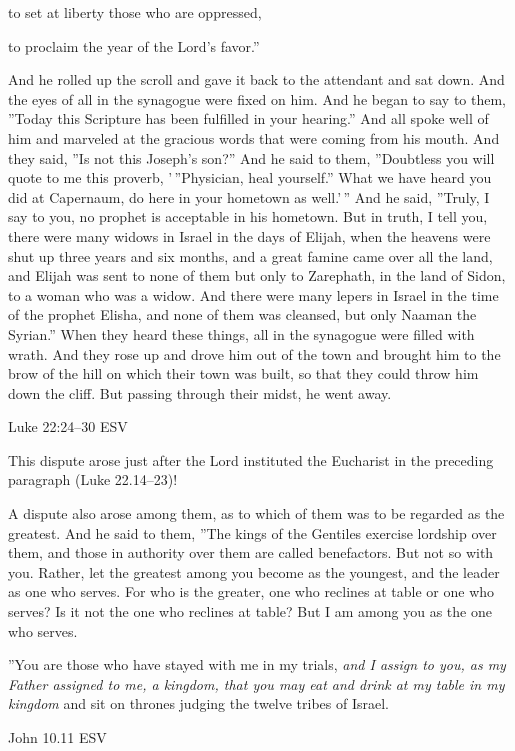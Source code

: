 \documentclass[
]{article}
\newcommand{\RL}[1]{\beginR #1\endR}
\begin{document}
to set at liberty those who are oppressed,

to proclaim the year of the Lord\RL{'}s favor.''

And he rolled up the scroll and gave it back to the attendant and sat
down. And the eyes of all in the synagogue were fixed on him. And he
began to say to them, \RL{''}Today this Scripture has been fulfilled in
your hearing.'' And all spoke well of him and marveled at the gracious
words that were coming from his mouth. And they said, \RL{''}Is not this
Joseph\RL{'}s son?'' And he said to them, \RL{''}Doubtless you will
quote to me this proverb, \RL{'\,''}Physician, heal yourself.'' What we
have heard you did at Capernaum, do here in your hometown as well.'\,''
And he said, \RL{''}Truly, I say to you, no prophet is acceptable in his
hometown. But in truth, I tell you, there were many widows in Israel in
the days of Elijah, when the heavens were shut up three years and six
months, and a great famine came over all the land, and Elijah was sent
to none of them but only to Zarephath, in the land of Sidon, to a woman
who was a widow. And there were many lepers in Israel in the time of the
prophet Elisha, and none of them was cleansed, but only Naaman the
Syrian.'' When they heard these things, all in the synagogue were filled
with wrath. And they rose up and drove him out of the town and brought
him to the brow of the hill on which their town was built, so that they
could throw him down the cliff. But passing through their midst, he went
away.

Luke 22:24--30 ESV

This dispute arose just after the Lord instituted the Eucharist in the
preceding paragraph (Luke 22.14--23)!

A dispute also arose among them, as to which of them was to be regarded
as the greatest. And he said to them, \RL{''}The kings of the Gentiles
exercise lordship over them, and those in authority over them are called
benefactors. But not so with you. Rather, let the greatest among you
become as the youngest, and the leader as one who serves. For who is the
greater, one who reclines at table or one who serves? Is it not the one
who reclines at table? But I am among you as the one who serves.

\RL{''}You are those who have stayed with me in my trials, \emph{and I
assign to you, as my Father assigned to me, a kingdom, that you may eat
and drink at my table in my kingdom} and sit on thrones judging the
twelve tribes of Israel.

John 10.11 ESV
\end{document}
